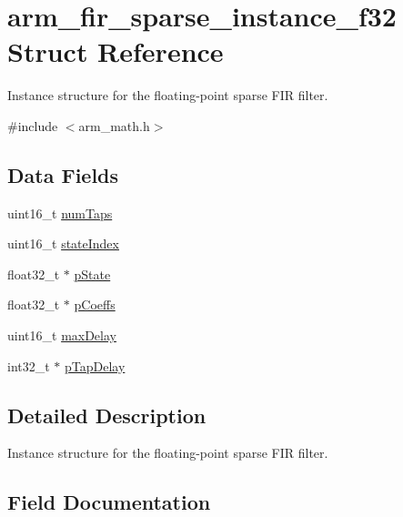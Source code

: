 \hypertarget{structarm__fir__sparse__instance__f32}{}\section{arm\+\_\+fir\+\_\+sparse\+\_\+instance\+\_\+f32 Struct Reference}
\label{structarm__fir__sparse__instance__f32}


Instance structure for the floating-\/point sparse F\+IR filter.  




{\ttfamily \#include $<$arm\+\_\+math.\+h$>$}

\subsection*{Data Fields}
\begin{DoxyCompactItemize}
\item 
uint16\+\_\+t \hyperlink{structarm__fir__sparse__instance__f32_a751941891e47f522a7f5375fe8990aac}{num\+Taps}
\item 
uint16\+\_\+t \hyperlink{structarm__fir__sparse__instance__f32_a566a0cb53437e48b9a3bf18e5b03d8aa}{state\+Index}
\item 
float32\+\_\+t $\ast$ \hyperlink{structarm__fir__sparse__instance__f32_a335c87e6fdc4b96601d95a5de8b9c463}{p\+State}
\item 
float32\+\_\+t $\ast$ \hyperlink{structarm__fir__sparse__instance__f32_aacbb8dd8eeba4b21fc2bb40076405ee3}{p\+Coeffs}
\item 
uint16\+\_\+t \hyperlink{structarm__fir__sparse__instance__f32_ab25f4ee7550e6d92acff77ada283733f}{max\+Delay}
\item 
int32\+\_\+t $\ast$ \hyperlink{structarm__fir__sparse__instance__f32_adec00b3793ab4f08edfeb4ea6a9eb6e6}{p\+Tap\+Delay}
\end{DoxyCompactItemize}


\subsection{Detailed Description}
Instance structure for the floating-\/point sparse F\+IR filter. 

\subsection{Field Documentation}
\mbox{\label{structarm__fir__sparse__instance__f32_ab25f4ee7550e6d92acff77ada283733f}} 
